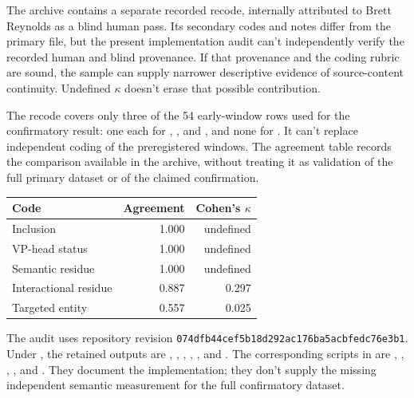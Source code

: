 \documentclass[12pt]{article}
\begin{document}
The archive contains a separate recorded recode, internally attributed to
Brett Reynolds as a blind human pass. Its secondary codes and notes differ
from the primary file, but the present implementation audit can't
independently verify the recorded human and blind provenance. If that
provenance and the coding rubric are sound, the sample can supply narrower
descriptive evidence of source-content continuity. Undefined $\kappa$
doesn't erase that possible contribution.

The recode covers only three of the 54 early-window rows used for the
confirmatory result: one each for , , and
, and none for . It can't replace
independent coding of the preregistered windows. The agreement table
records the comparison available in the archive, without treating it
as validation of the full primary dataset or of the claimed confirmation.


\begin{center}
\begin{tabular}{lrr}
  \toprule
  Code & Agreement & Cohen's $\kappa$ \\
  \midrule
  Inclusion & 1.000 & undefined \\
  VP-head status & 1.000 & undefined \\
  Semantic residue & 1.000 & undefined \\
  Interactional residue & 0.887 & 0.297 \\
  Targeted entity & 0.557 & 0.025 \\
  \bottomrule
\end{tabular}
\end{center}

The audit uses repository revision \texttt{074dfb44cef5b18d292ac176ba5acbfedc76e3b1}. Under , the retained outputs are , , , , , and . The corresponding scripts in  are , , , , and . They document the implementation; they don't supply the missing independent semantic measurement for the full confirmatory dataset.

\clearpage
\end{document}
